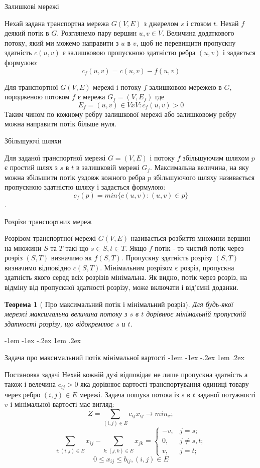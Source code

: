 \documentclass[a4paper,14pt,russian,ukrainian,oneside,final]{extreport}
\makeatletter
\newlength{\fivecharsapprox}
\newlength{\fivecharsapproxs}
\renewcommand\section{%
  \clearpage\@startsection {section}{0}%
    {\fivecharsapproxs}%
    {-1em \@plus -1ex \@minus -.2ex}%
    {1em \@plus .2ex}%
    {\raggedright\hyphenpenalty=10000\normalfont\large\bfseries\MakeUppercase {}}
}
\renewcommand\subsection{%
  \@startsection{subsection}{2}%
    {\fivecharsapprox}%
    {-1em \@plus -1ex \@minus -.2ex}%
    {1em \@plus .2ex}%
    {\raggedright\hyphenpenalty=10000\normalfont\normalsize\bfseries}}
\makeatother
\begin{document}
\indent Залишкові мережі

\indent Нехай задана транспортна мережа $G(V,E)$ з джерелом $s$ і стоком $t$. Нехай $f$ деякий потік в $G$.
Розглянемо пару вершин $u,v \in V$. Величина додаткового потоку, який ми можемо 
направити з $u$ в $v$, щоб не перевищити пропускну здатність $c(u,v)$ є залишковою 
пропускною здатністю ребра $(u,v)$ і задається формулою:
$$c_{f}(u,v)=c(u,v)-f(u,v)$$

Для транспортної $G(V,E)$ мережі і потоку $f$ залишковою мережею в $G$, породженою потоком $f$ є мережа 
$G_{f}=(V,E_{f})$  где $$E_{f}=(u,v)\in VxV:c_{f}(u,v)>0$$
Таким чином по кожному ребру залишкової мережі або залишковому ребру можна направити потік більше нуля.

\indent Збільшуючі шляхи

\indent Для заданої транспортної мережі $G=(V,E)$ і потоку $f$ збільшуючим шляхом $p$ є простий шлях з $s$ в $t$ в залишковій мережі $G_{f}$.
Максимальна величина, на яку можна збільшити потік уздовж кожного ребра $p$ збільшуючого шляху називається пропускною здатністю шляху і задається формулою:
$$c_{f}(p)=min\{c(u,v):(u,v)\in p\}$$.

\indent Розрізи транспортних мереж

\indent Розрізом транспортної мережі $G(V,E)$ називається розбиття множини вершин на множини $S$ та $T$ такі що $s\in S, t\in T$.
Якщо $f$ потік - то чистий потік через розріз $(S,T)$ визначимо як $f(S,T)$.
Пропускну здатність розрізу $(S,T)$ визначимо відповідно $c(S,T)$.
Мінімальним розрізом є розріз, пропускна здатність якого серед всіх розрізів мінімальна. Як видно, 
потік через розріз, на відміну від пропускної здатності розрізу, може включати і від’ємні доданки.
\newtheorem{theorem}{Теорема}
\begin{theorem}[ Про максимальний потік і мінімальний розріз]
Для будь-якої мережі максимальна величина потоку з $s$ в $t$ 
дорівнює мінімальній пропускній здатності розрізу, що відокремлює $s$ и $t$.  \cite{ford}
\end{theorem}


\section{ Задача про максимальний потік мінімальної вартості}
\subsection{Постановка задачі}
Нехай кожній дузі відповідає не лише пропускна здатність а також і велечина $c_{ij}>0$ яка дорівнює вартості транспортування одиниці товару через ребро $(i,j)\in E$ мережі.
Задача пошука потока  із $s$ в $t$ заданої потужності $v$  і мінімальної вартості має вигляд:
$$Z=\sum_{(i,j)\in E} c_{ij}x_{ij}\to min_{x};$$
$$\sum_{i:(i,j)\in E}x_{ij}-\sum_{k:(j,k)\in E}x_{jk}=
 \begin{cases}
   -v, &j=s;\\
   0, &j \neq s,t;\\
   v,&j=t;
 \end{cases}$$
$$
0\leq x_{ij}\leq b_{ij}, (i,j)\in E
$$
\end{document}
